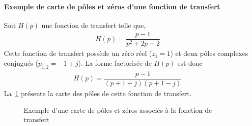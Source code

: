 \paragraph{Exemple de carte de pôles et zéros d'une fonction de transfert}
Soit $H(p)$ une fonction de transfert telle que,
\begin{align}
    H(p)=\dfrac{p-1}{p^2+2p+2}\label{eq-ft_carte}
\end{align}
Cette fonction de transfert possède un zéro réel ($z_1=1$) et deux 
pôles complexes conjugués ($p_{1,2}=-1\pm j$).
La forme factorisée de $H(p)$ est donc
\begin{align} 
    H(p)=\dfrac{p-1}{(p+1+j)(p+1-j)}
\end{align}
La~\cref{fig-carte} présente la carte des pôles de cette fonction de transfert.
\begin{figure}[!h]
    \center
    
    \caption{Exemple d'une carte de pôles et zéros associés à la 
             fonction de transfert~\label{fig-carte}}
\end{figure}
